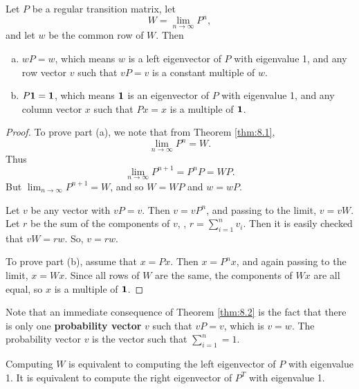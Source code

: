 \begin{theorem}
\label{thm:8.2}
Let $P$ be a regular transition matrix, let
\begin{equation*}
    W = \lim_{n\to\infty} P^n,
\end{equation*}
and let $w$ be the common row of $W$. Then
\begin{enumerate}[(a)]
    \item 
    $wP = w$, which means $w$ is a left eigenvector of $P$ with eigenvalue 1, and any row vector $v$ such that $vP = v$ is a constant multiple of $w$.
    
    \item 
    $P\mathbf{1} = \mathbf{1}$, which means $\mathbf{1}$ is an eigenvector of $P$ with eigenvalue 1, and any column vector $x$ such that $Px = x$ is a multiple of $\mathbf{1}$.
\end{enumerate}
\end{theorem}

\begin{proof}
To prove part (a), we note that from Theorem \ref{thm:8.1}, 
\begin{equation*}
    \lim_{n\to\infty} P^n = W.
\end{equation*}
Thus
\begin{equation*}
    \lim_{n\to\infty} P^{n+1} = P^n P = W P.
\end{equation*}
But $\lim_{n\to\infty} P^{n+1} = W$, and so $W = WP$ and $w = wP$.

Let $v$ be any vector with $vP = v$. Then $v = vP^n$, and passing to the limit, $v = vW$. Let $r$ be the sum of the components of $v$, \ie, $r = \sum_{i=1}^n v_i$. Then it is easily checked that $vW = rw$. So, $v = rw$.

To prove part (b), assume that $x = Px$. Then $x = P^n x$, and again passing to the limit, $x = Wx$. Since all rows of $W$ are the same, the components of $Wx$ are all equal, so $x$ is a multiple of $\mathbf{1}$.
\end{proof}

Note that an immediate consequence of Theorem \ref{thm:8.2} is the fact that there is only one \textbf{probability vector} $v$ such that $vP = v$, which is $v = w$. The probability vector $v$ is the vector such that $\sum_{i=1}^n = 1$.

\begin{remark}
Computing $W$ is equivalent to computing the left eigenvector of $P$ with eigenvalue 1. It is equivalent to compute the right eigenvector of $P^T$ with eigenvalue 1.
\end{remark}

